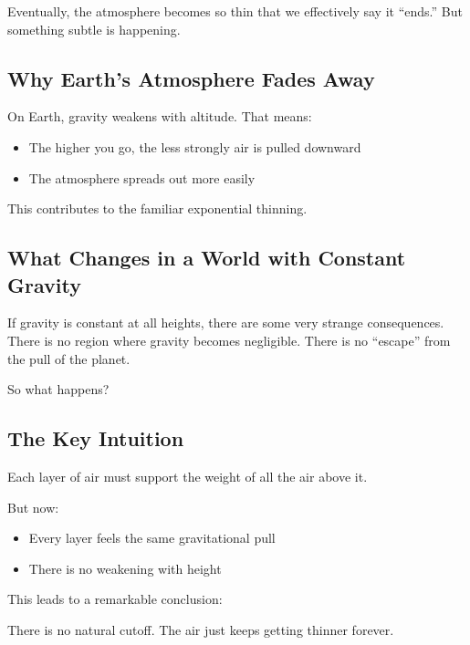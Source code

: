 \documentclass[11pt, letterpaper]{article}
\begin{document}
Eventually, the atmosphere becomes so thin that we effectively say it ``ends.'' But something subtle is happening.

\subsection{Why Earth's Atmosphere Fades Away}

On Earth, gravity weakens with altitude. That means:

\begin{itemize}
\item The higher you go, the less strongly air is pulled downward
\item The atmosphere spreads out more easily
\end{itemize}

This contributes to the familiar exponential thinning.

\subsection{What Changes in a World with Constant Gravity}

If gravity is constant at all heights, there are some very strange consequences. There is no region where gravity becomes negligible. There is no ``escape'' from the pull of the planet.

So what happens?

\subsection{The Key Intuition}

Each layer of air must support the weight of all the air above it.

But now:

\begin{itemize}
\item Every layer feels the same gravitational pull
\item There is no weakening with height
\end{itemize}

This leads to a remarkable conclusion:

\begin{center}
\end{center}

There is no natural cutoff. The air just keeps getting thinner forever.
\end{document}
